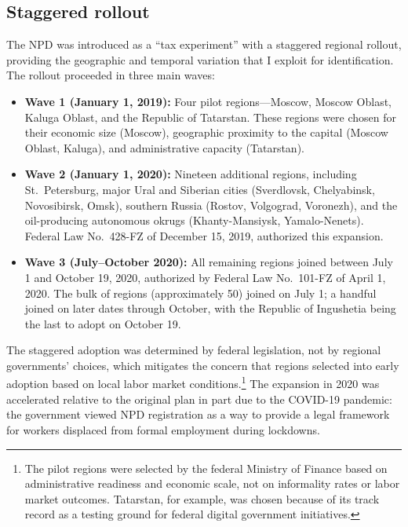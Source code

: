\documentclass[12pt]{article}
\begin{document}
\subsection{Staggered rollout}

The NPD was introduced as a ``tax experiment'' with a staggered regional rollout, providing the geographic and temporal variation that I exploit for identification. The rollout proceeded in three main waves:

\begin{itemize}
\item \textbf{Wave 1 (January 1, 2019):} Four pilot regions---Moscow, Moscow Oblast, Kaluga Oblast, and the Republic of Tatarstan. These regions were chosen for their economic size (Moscow), geographic proximity to the capital (Moscow Oblast, Kaluga), and administrative capacity (Tatarstan).

\item \textbf{Wave 2 (January 1, 2020):} Nineteen additional regions, including St.~Petersburg, major Ural and Siberian cities (Sverdlovsk, Chelyabinsk, Novosibirsk, Omsk), southern Russia (Rostov, Volgograd, Voronezh), and the oil-producing autonomous okrugs (Khanty-Mansiysk, Yamalo-Nenets). Federal Law No.~428-FZ of December 15, 2019, authorized this expansion.

\item \textbf{Wave 3 (July--October 2020):} All remaining regions joined between July 1 and October 19, 2020, authorized by Federal Law No.~101-FZ of April 1, 2020. The bulk of regions (approximately 50) joined on July 1; a handful joined on later dates through October, with the Republic of Ingushetia being the last to adopt on October 19.
\end{itemize}

\noindent The staggered adoption was determined by federal legislation, not by regional governments' choices, which mitigates the concern that regions selected into early adoption based on local labor market conditions.\footnote{The pilot regions were selected by the federal Ministry of Finance based on administrative readiness and economic scale, not on informality rates or labor market outcomes. Tatarstan, for example, was chosen because of its track record as a testing ground for federal digital government initiatives.} The expansion in 2020 was accelerated relative to the original plan in part due to the COVID-19 pandemic: the government viewed NPD registration as a way to provide a legal framework for workers displaced from formal employment during lockdowns.
\end{document}
